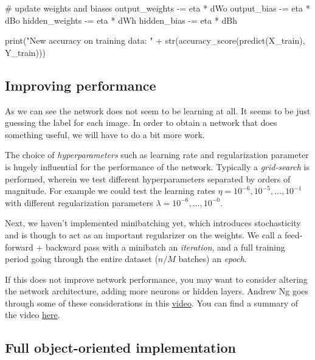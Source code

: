 \documentclass[%
oneside,                 %
final,                   %
10pt]{article}
\begin{document}
    # update weights and biases
    output_weights -= eta * dWo
    output_bias -= eta * dBo
    hidden_weights -= eta * dWh
    hidden_bias -= eta * dBh

print("New accuracy on training data: " + str(accuracy_score(predict(X_train), Y_train)))

\epycod


\subsection{Improving performance}

As we can see the network does not seem to be learning at all. It seems to be just guessing the label for each image.  
In order to obtain a network that does something useful, we will have to do a bit more work.  

The choice of \emph{hyperparameters} such as learning rate and regularization parameter is hugely influential for the performance of the network. Typically a \emph{grid-search} is performed, wherein we test different hyperparameters separated by orders of magnitude. For example we could test the learning rates $\eta = 10^{-6}, 10^{-5},...,10^{-1}$ with different regularization parameters $\lambda = 10^{-6},...,10^{-0}$.  

Next, we haven't implemented minibatching yet, which introduces stochasticity and is though to act as an important regularizer on the weights. We call a feed-forward + backward pass with a minibatch an \emph{iteration}, and a full training period
going through the entire dataset ($n/M$ batches) an \emph{epoch}.

If this does not improve network performance, you may want to consider altering the network architecture, adding more neurons or hidden layers.  
Andrew Ng goes through some of these considerations in this \href{{https://youtu.be/F1ka6a13S9I}}{video}. You can find a summary of the video \href{{https://kevinzakka.github.io/2016/09/26/applying-deep-learning/}}{here}.  

\subsection{Full object-oriented implementation}
\end{document}
